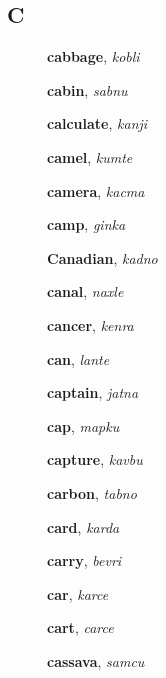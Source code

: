 \documentclass[12pt]{book}
\begin{document}
\subsection{C} %

\begin{description}

\item[ ] \textbf{cabbage}, \textit{kobli}

\item[ ] \textbf{cabin}, \textit{sabnu}

\item[ ] \textbf{calculate}, \textit{kanji}

\item[ ] \textbf{camel}, \textit{kumte}

\item[ ] \textbf{camera}, \textit{kacma}

\item[ ] \textbf{camp}, \textit{ginka}

\item[ ] \textbf{Canadian}, \textit{kadno}

\item[ ] \textbf{canal}, \textit{naxle}

\item[ ] \textbf{cancer}, \textit{kenra}

\item[ ] \textbf{can}, \textit{lante}

\item[ ] \textbf{captain}, \textit{jatna}

\item[ ] \textbf{cap}, \textit{mapku}

\item[ ] \textbf{capture}, \textit{kavbu}

\item[ ] \textbf{carbon}, \textit{tabno}

\item[ ] \textbf{card}, \textit{karda}

\item[ ] \textbf{carry}, \textit{bevri}

\item[ ] \textbf{car}, \textit{karce}

\item[ ] \textbf{cart}, \textit{carce}

\item[ ] \textbf{cassava}, \textit{samcu}


\end{description}
\end{document}
